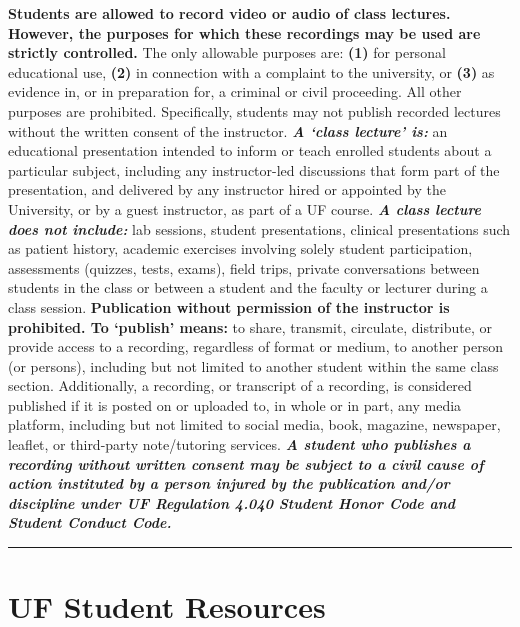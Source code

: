 \documentclass[
  10pt,
  letterpaper,
  oneside,
  open=any]{scrbook}
\begin{document}
\textbf{Students are allowed to record video or audio of class lectures.
However, the purposes for which these recordings may be used are
strictly controlled.} The only allowable purposes are: \textbf{(1)} for
personal educational use, \textbf{(2)} in connection with a complaint to
the university, or \textbf{(3)} as evidence in, or in preparation for, a
criminal or civil proceeding. All other purposes are prohibited.
Specifically, students may not publish recorded lectures without the
written consent of the instructor. \textbf{\emph{A `class lecture' is:}}
an educational presentation intended to inform or teach enrolled
students about a particular subject, including any instructor-led
discussions that form part of the presentation, and delivered by any
instructor hired or appointed by the University, or by a guest
instructor, as part of a UF course. \textbf{\emph{A class lecture does
not include:}} lab sessions, student presentations, clinical
presentations such as patient history, academic exercises involving
solely student participation, assessments (quizzes, tests, exams), field
trips, private conversations between students in the class or between a
student and the faculty or lecturer during a class session.
\textbf{Publication without permission of the instructor is prohibited.
To `publish' means:} to share, transmit, circulate, distribute, or
provide access to a recording, regardless of format or medium, to
another person (or persons), including but not limited to another
student within the same class section. Additionally, a recording, or
transcript of a recording, is considered published if it is posted on or
uploaded to, in whole or in part, any media platform, including but not
limited to social media, book, magazine, newspaper, leaflet, or
third-party note/tutoring services. \textbf{\emph{A student who
publishes a recording without written consent may be subject to a civil
cause of action instituted by a person injured by the publication and/or
discipline under UF Regulation 4.040 Student Honor Code and Student
Conduct Code.}}

\begin{center}\rule{0.5\linewidth}{0.5pt}\end{center}


\chapter{UF Student Resources}\label{uf-student-resources}
\end{document}
